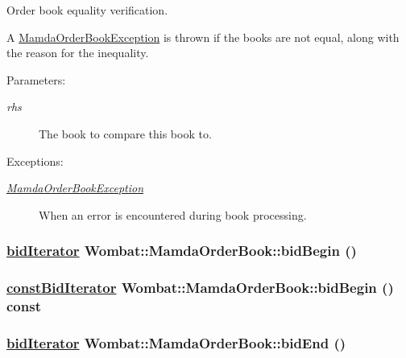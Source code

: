 Order book equality verification. 

A \hyperlink{classWombat_1_1MamdaOrderBookException}{Mamda\-Order\-Book\-Exception} is thrown if the books are not equal, along with the reason for the inequality.

\begin{Desc}
\item[Parameters:]
\begin{description}
\item[{\em rhs}]The book to compare this book to.\end{description}
\end{Desc}
\begin{Desc}
\item[Exceptions:]
\begin{description}
\item[{\em \hyperlink{classWombat_1_1MamdaOrderBookException}{Mamda\-Order\-Book\-Exception}}]When an error is encountered during book processing. \end{description}
\end{Desc}
\hypertarget{classWombat_1_1MamdaOrderBook_8e110890737405ea8cd1d6edd90ec61b}{
\subsubsection[bidBegin]{\setlength{\rightskip}{0pt plus 5cm}\hyperlink{classWombat_1_1MamdaOrderBook_1_1bidIterator}{bid\-Iterator} Wombat::Mamda\-Order\-Book::bid\-Begin ()}}
\label{classWombat_1_1MamdaOrderBook_8e110890737405ea8cd1d6edd90ec61b}


\hypertarget{classWombat_1_1MamdaOrderBook_4b231fc2074bfb87af693c82c315dd10}{
\subsubsection[bidBegin]{\setlength{\rightskip}{0pt plus 5cm}\hyperlink{classWombat_1_1MamdaOrderBook_1_1bidIterator}{const\-Bid\-Iterator} Wombat::Mamda\-Order\-Book::bid\-Begin () const}}
\label{classWombat_1_1MamdaOrderBook_4b231fc2074bfb87af693c82c315dd10}


\hypertarget{classWombat_1_1MamdaOrderBook_84a7d4b1580b4640897af10bc13908ab}{
\subsubsection[bidEnd]{\setlength{\rightskip}{0pt plus 5cm}\hyperlink{classWombat_1_1MamdaOrderBook_1_1bidIterator}{bid\-Iterator} Wombat::Mamda\-Order\-Book::bid\-End ()}}
\label{classWombat_1_1MamdaOrderBook_84a7d4b1580b4640897af10bc13908ab}



